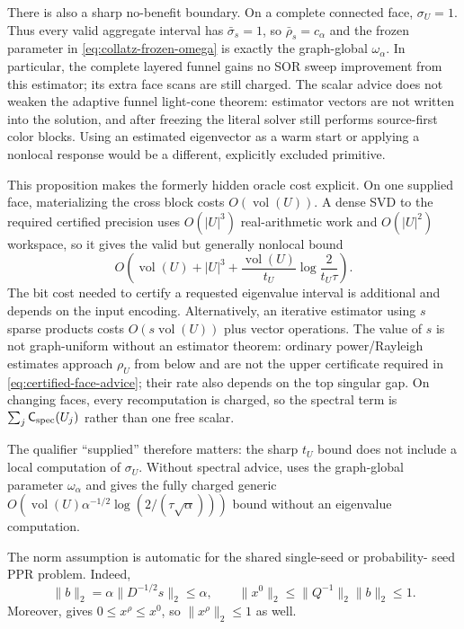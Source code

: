 There is also a sharp no-benefit boundary.  On a complete connected face,
$\sigma_U=1$.  Thus every valid aggregate interval has
$\bar\sigma_s=1$, so $\bar\rho_s=c_\alpha$ and the frozen parameter in
\eqref{eq:collatz-frozen-omega} is exactly the graph-global
$\omega_\alpha$.  In particular, the complete layered funnel gains no SOR
sweep improvement from this estimator; its extra face scans are still
charged.  The scalar advice does not weaken the adaptive funnel light-cone
theorem: estimator vectors are not written into the solution, and after
freezing the literal solver still performs source-first color blocks.  Using
an estimated eigenvector as a warm start or applying a nonlocal response would
be a different, explicitly excluded primitive.

This proposition makes the formerly hidden oracle cost explicit.  On one
supplied face, materializing the cross block costs
$O(\operatorname{vol}(U))$.  A dense SVD to the required certified precision
uses $O(|U|^3)$ real-arithmetic work and $O(|U|^2)$ workspace, so it gives the
valid but generally nonlocal bound
\begin{equation}
 O\!\left(
  \operatorname{vol}(U)+|U|^3
  +\frac{\operatorname{vol}(U)}{t_U}
   \log\frac{2}{t_U\tau}
 \right).
 \label{eq:dense-face-spectral-work}
\end{equation}
The bit cost needed to certify a requested eigenvalue interval is additional
and depends on the input encoding.  Alternatively, an iterative estimator
using $s$ sparse products costs $O(s\operatorname{vol}(U))$ plus vector
operations.  The value of $s$ is not graph-uniform without an estimator
theorem: ordinary power/Rayleigh estimates approach $\rho_U$ from below and
are not the upper certificate required in
\eqref{eq:certified-face-advice}; their rate also depends on the top singular
gap.  On changing faces, every recomputation is charged, so the spectral term
is $\sum_j\mathsf C_{\rm spec}(U_j)$ rather than one free scalar.

The qualifier ``supplied'' therefore matters: the sharp $t_U$ bound does not
include a local computation of $\sigma_U$.  Without spectral advice,
 uses the graph-global parameter
$\omega_\alpha$ and gives the fully charged generic
$O(\operatorname{vol}(U)\alpha^{-1/2}
\log(2/(\tau\sqrt\alpha)))$ bound without an eigenvalue computation.

The norm assumption is automatic for the shared single-seed or probability-
seed PPR problem.  Indeed,
\begin{equation}
 \|b\|_2=\alpha\|D^{-1/2}s\|_2\leq\alpha,
 \qquad
 \|x^0\|_2\leq\|Q^{-1}\|_2\|b\|_2\leq1.
 \label{eq:ppr-unit-two-norm}
\end{equation}
Moreover,  gives
$0\leq x^\rho\leq x^0$, so $\|x^\rho\|_2\leq1$ as well.

